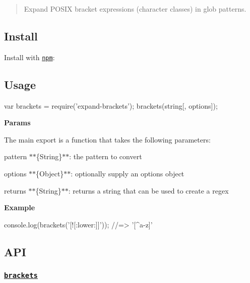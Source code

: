\begin{quote}
Expand P\+O\+S\+IX bracket expressions (character classes) in glob patterns. \end{quote}


\subsection*{Install}

Install with \href{https://www.npmjs.com/}{\tt npm}\+:




\subsection*{Usage}


\begin{DoxyCode}
var brackets = require('expand-brackets');
brackets(string[, options]);
\end{DoxyCode}


{\bfseries Params}

The main export is a function that takes the following parameters\+:


\begin{DoxyItemize}
\item {\ttfamily pattern} $\ast$$\ast$\{String\}$\ast$$\ast$\+: the pattern to convert
\item {\ttfamily options} $\ast$$\ast$\{Object\}$\ast$$\ast$\+: optionally supply an options object
\item {\ttfamily returns} $\ast$$\ast$\{String\}$\ast$$\ast$\+: returns a string that can be used to create a regex
\end{DoxyItemize}

{\bfseries Example}


\begin{DoxyCode}
console.log(brackets('[![:lower:]]'));
//=> '[^a-z]'
\end{DoxyCode}


\subsection*{A\+PI}

\subsubsection*{\href{index.js#L29}{\tt brackets}}

